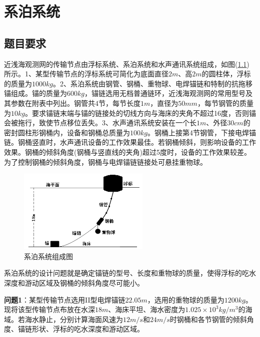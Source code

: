 % 
\chapter{系泊系统}
\section{题目要求}
    \par
    近浅海观测网的传输节点由浮标系统、系泊系统和水声通讯系统组成，如图(\ref{fig:系泊系统组成图})所示。1、某型传输节点的浮标系统可简化为底面直径$2m$、高$2m$的圆柱体，浮标的质量为$1000kg$。2、系泊系统由钢管、钢桶、重物球、电焊锚链和特制的抗拖移锚组成。锚的质量为$600kg$，锚链选用无档普通链环，近浅海观测网的常用型号及其参数在附表中列出。钢管共4节，每节长度$1m$，直径为$50mm$，每节钢管的质量为$10kg$。要求锚链末端与锚的链接处的切线方向与海床的夹角不超过16度，否则锚会被拖行，致使节点移位丢失。3、水声通讯系统安装在一个长$1m$、外径$30cm$的密封圆柱形钢桶内，设备和钢桶总质量为$100kg$。钢桶上接第4节钢管，下接电焊锚链。钢桶竖直时，水声通讯设备的工作效果最佳。若钢桶倾斜，则影响设备的工作效果。钢桶的倾斜角度(钢桶与竖直线的夹角)超过5度时，设备的工作效果较差。为了控制钢桶的倾斜角度，钢桶与电焊锚链链接处可悬挂重物球。
            \begin{figure}[H]
            \centering
            \includegraphics[height=4cm]{images/xiposystem.jpg}
            \caption{系泊系统组成图}
            \label{fig:系泊系统组成图}
            \end{figure}
    \par
    系泊系统的设计问题就是确定锚链的型号、长度和重物球的质量，使得浮标的吃水深度和游动区域及钢桶的倾斜角度尽可能小。
    \par
    \textbf{问题1}：某型传输节点选用II型电焊锚链$22.05m$，选用的重物球的质量为$1200kg$。现将该型传输节点布放在水深$18m$、海床平坦、海水密度为$1.025\times 10^3kg/m^3$的海域。若海水静止，分别计算海面风速为$12m/s$和$24m/s$时钢桶和各节钢管的倾斜角度、锚链形状、浮标的吃水深度和游动区域。
